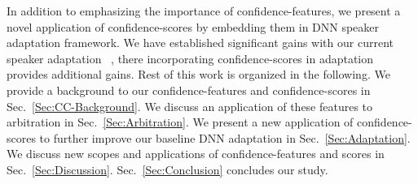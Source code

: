 In addition to emphasizing the importance of confidence-features, we present a novel application of confidence-scores by embedding them in DNN speaker adaptation framework. We have established significant gains with our current speaker adaptation ~\cite{XueSVDAdaptation}, there incorporating confidence-scores in adaptation provides additional gains. Rest of this work is organized in the following. We provide a background to our confidence-features and confidence-scores in Sec.~\ref{Sec:CC-Background}. We discuss an application of these features to arbitration in Sec.~\ref{Sec:Arbitration}. We present a new application of confidence-scores to further improve our baseline DNN adaptation \cite{XueSVDAdaptation} in Sec.~\ref{Sec:Adaptation}. We discuss  new scopes and applications of confidence-features and scores in Sec.~\ref{Sec:Discussion}. Sec.~\ref{Sec:Conclusion} concludes our study.